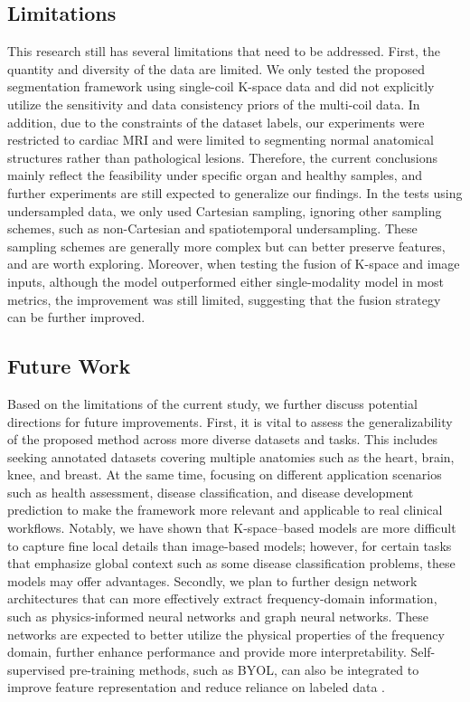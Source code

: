 \documentclass[12pt,a4paper]{article}
\begin{document}
\subsection{Limitations}
This research still has several limitations that need to be addressed. First, the quantity and diversity of the data are limited. We only tested the proposed segmentation framework using single-coil K-space data and did not explicitly utilize the sensitivity and data consistency priors of the multi-coil data. In addition, due to the constraints of the dataset labels, our experiments were restricted to cardiac MRI and were limited to segmenting normal anatomical structures rather than pathological lesions. Therefore, the current conclusions mainly reflect the feasibility under specific organ and healthy samples, and further experiments are still expected to generalize our findings. In the tests using undersampled data, we only used Cartesian sampling, ignoring other sampling schemes, such as non-Cartesian and spatiotemporal undersampling. These sampling schemes are generally more complex but can better preserve features, and are worth exploring. Moreover, when testing the fusion of K-space and image inputs, although the model outperformed either single-modality model in most metrics, the improvement was still limited, suggesting that the fusion strategy can be further improved.

\subsection{Future Work}
Based on the limitations of the current study, we further discuss potential directions for future improvements. First, it is vital to assess the generalizability of the proposed method across more diverse datasets and tasks. This includes seeking annotated datasets covering multiple anatomies such as the heart, brain, knee, and breast. At the same time, focusing on different application scenarios such as health assessment, disease classification, and disease development prediction to make the framework more relevant and applicable to real clinical workflows. Notably, we have shown that K-space–based models are more difficult to capture fine local details than image-based models; however, for certain tasks that emphasize global context such as some disease classification problems, these models may offer advantages. Secondly, we plan to further design network architectures that can more effectively extract frequency-domain information, such as physics-informed neural networks and graph neural networks. These networks are expected to better utilize the physical properties of the frequency domain, further enhance performance and provide more interpretability. Self-supervised pre-training methods, such as BYOL, can also be integrated to improve feature representation and reduce reliance on labeled data \cite{29}.
\end{document}
